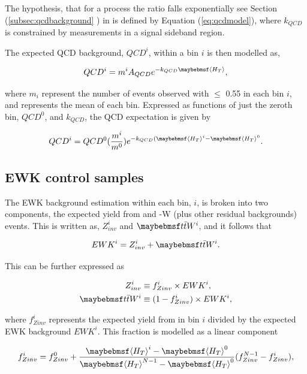 The hypothesis, that for a process the \alphat ratio falls exponentially see Section (\ref{subsec:qcdbackground} ) in \theht is defined by Equation (\ref{eq:qcdmodel}), where $k_{QCD}$ is constrained by measurements in a signal sideband region. 

The expected QCD background, $QCD^{i}$, within a bin $i$ is then modelled as,

\begin{equation}
QCD^{i} = m^{i}A_{QCD}e^{-k_{QCD}\meanht},
\end{equation}

where $m_{i}$ represent the number of events observed with \alphat $\leq$ 0.55 in each \theht bin $i$, and \meanht represents the mean \theht of each bin. Expressed as functions of just the zeroth bin, $QCD^{0}$, and $k_{QCD}$, the QCD expectation is given by

\begin{equation}
QCD^{i} = QCD^{0}(\frac{m^{i}}{m^{0}})e^{-k_{QCD}(\meanht^{i}-\meanht^{0}}.
\end{equation} 

\subsection{\ac{EWK} control samples}
\label{subsec:ewkmodel}

The \ac{EWK} background estimation within each bin, $i$, is broken into two components, the expected yield from \zinv and \ttbar-W (plus other residual backgrounds) events. This is written as, $Z^{i}_{inv}$ and $\ttbar W^{i}$, and it follows that 

\begin{equation}
EWK^{i} = Z^{i}_{inv} + \ttbar W^{i}.
\end{equation}

This can be further expressed as

\begin{align}
\label{eq:zinvcontribution}
Z^{i}_{inv} &\equiv f^{i}_{Zinv} \times EWK^{i}, \\
\label{eq:ttwcontribution}
\ttbar W^{i} &\equiv (1 - f^{i}_{Zinv}) \times EWK^{i},
\end{align}

where $f^{i}_{Zinv}$ represents the expected yield from \zinv in bin $i$ divided by the expected \ac{EWK} background $EWK^{i}$. This fraction is modelled as a linear component

\begin{equation}
f^{i}_{Zinv} = f^{0}_{Zinv} + \frac{\meanht^{i}-\meanht^{0}}{\meanht^{N-1}-\meanht^{0}}(f^{N-1}_{Zinv} - f^{i}_{Zinv}),
\end{equation}


